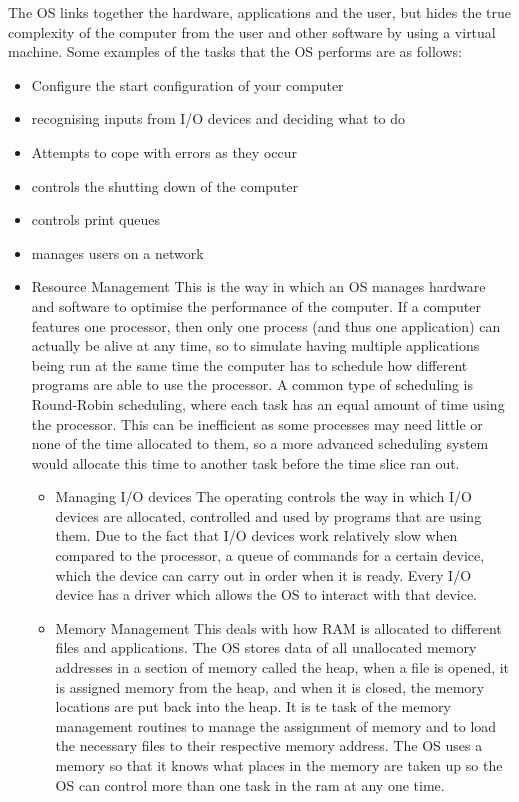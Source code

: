   The OS links together the hardware, applications and the user, but hides the true complexity of the computer from the user and other software by using a virtual machine. Some examples of the tasks that the OS performs are as follows:
  \begin{itemize}
    \item Configure the start configuration of your computer
    \item recognising inputs from I/O devices and deciding what to do
    \item Attempts to cope with errors as they occur
    \item controls the shutting down of the computer
    \item controls print queues
    \item manages users on a network
    \item Resource Management
    \subitem This is the way in which an OS manages hardware and software to optimise the performance of the computer. If a computer features one processor, then only one process (and thus one application) can actually be alive at any time, so to simulate having multiple applications being run at the same time the computer has to schedule how different programs are able to use the processor. A common type of scheduling is Round-Robin scheduling, where each task has an equal amount of time using the processor. This can be inefficient as some processes may need little or none of the time allocated to them, so a more advanced scheduling system would allocate this time to another task before the time slice ran out.
    \begin{itemize}
      \setlength{\itemsep}{0em}
      \item Managing I/O devices
        \subitem The operating controls the way in which I/O devices are allocated, controlled and used by programs that are using them. Due to the fact that I/O devices work relatively slow when compared to the processor, a queue of commands for a certain device, which the device can carry out in order when it is ready. Every I/O device has a driver which allows the OS to interact with that device.
      \item Memory Management
        \subitem This deals with how RAM is allocated to different files and applications. The OS stores data of all unallocated memory addresses in a section of memory called the heap, when a file is opened, it is assigned memory from the heap, and when it is closed, the memory locations are put back into the heap. It is te task of the memory management routines to manage the assignment of memory and to load the necessary files to their respective memory address. The OS uses a memory so that it knows what places in the memory are taken up so the OS can control more than one task in the ram at any one time.

\end{itemize}
\end{itemize}
